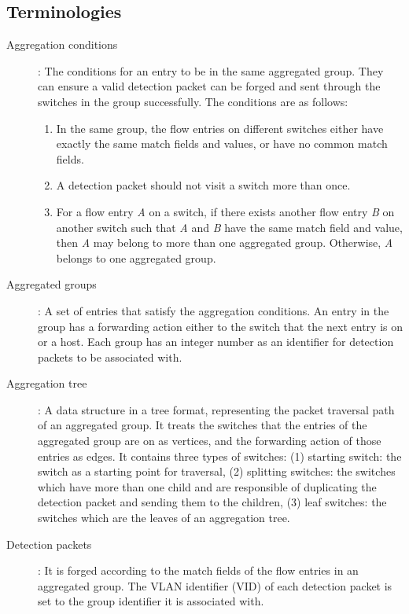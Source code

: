 \subsection{Terminologies}

\begin{description}%

\item
[Aggregation conditions]:
The conditions for an entry to be in the same aggregated group. They can ensure a valid detection packet can be forged and sent through the switches in the group successfully. The conditions are as follows:
\begin{enumerate}[label={\arabic*)}]
\item
In the same group, the flow entries on different switches either have exactly the same match fields and values, or have no common match fields.
\item
A detection packet should not visit a switch more than once.
\item
For a flow entry \textit{A} on a switch, if there exists another flow entry \textit{B} on another switch such that \textit{A} and \textit{B} have the same match field and value, then \textit{A} may belong to more than one aggregated group. Otherwise, \textit{A} belongs to one aggregated group.

\end{enumerate}

\item
[Aggregated groups]: 
A set of entries that satisfy the aggregation conditions. An entry in the group has a forwarding action either to the switch that the next entry is on or a host. Each group has an integer number as an identifier for detection packets to be associated with.

\item 
[Aggregation tree]:
A data structure in a tree format, representing the packet traversal path of an aggregated group. It treats the switches that the entries of the aggregated group are on as vertices, and the forwarding action of those entries as edges. It contains three types of switches: (1) starting switch: the switch as a starting point for traversal, (2) splitting switches: the switches which have more than one child and are responsible of duplicating the detection packet and sending them to the children, (3) leaf switches: the switches which are the leaves of an aggregation tree.

\item
[Detection packets]:
It is forged according to the match fields of the flow entries in an aggregated group. The VLAN identifier (VID) of each detection packet is set to the group identifier it is associated with.


\end{description}
